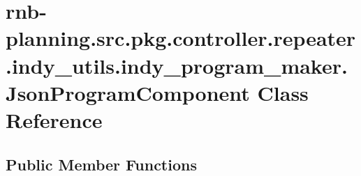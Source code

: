 \hypertarget{classrnb-planning_1_1src_1_1pkg_1_1controller_1_1repeater_1_1indy__utils_1_1indy__program__maker_1_1_json_program_component}{}\section{rnb-\/planning.src.\+pkg.\+controller.\+repeater.\+indy\+\_\+utils.\+indy\+\_\+program\+\_\+maker.\+Json\+Program\+Component Class Reference}
\label{classrnb-planning_1_1src_1_1pkg_1_1controller_1_1repeater_1_1indy__utils_1_1indy__program__maker_1_1_json_program_component}
\subsection*{Public Member Functions}
